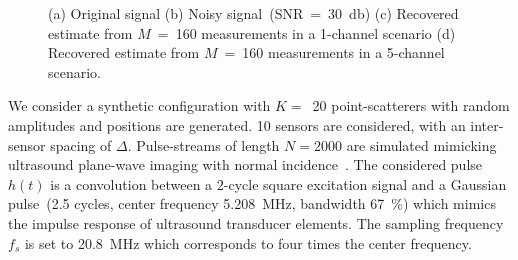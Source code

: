 \documentclass{article}
\theoremstyle{definition}
\begin{document}
\begin{figure}[htb]
	\hfill%
	\caption{(a) Original signal (b) Noisy signal~(SNR~=~\SI{30}{\decibel}) (c) Recovered estimate from $M$~=~\num{160} measurements in a \num{1}-channel scenario (d) Recovered estimate from $M$~=~\num{160} measurements in a \num{5}-channel scenario.}
	\label{fig_synth_noisy}
\end{figure}

We consider a synthetic configuration with $K=$~\num{20} point-scatterers with random amplitudes and positions are generated. 
\num{10} sensors are considered, with an inter-sensor spacing of $\Delta$. Pulse-streams of length $N = 2000$ are simulated mimicking ultrasound plane-wave imaging with normal incidence~\cite{montaldo_uffc_2014}.
The considered pulse $h\left(t\right)$ is a convolution between a $2$-cycle square excitation signal and a Gaussian pulse~(\num{2.5} cycles, center frequency \SI{5.208}{\mega\hertz}, bandwidth \SI{67}{\percent}) which mimics the impulse response of ultrasound transducer elements. The sampling frequency $f_s$ is set to \SI{20.8}{\mega\hertz} which corresponds to four times the center frequency.
\end{document}
